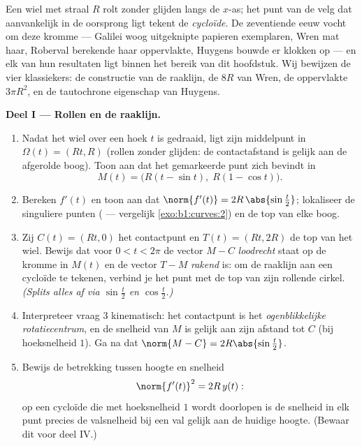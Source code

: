 \begin{problem}\label{pb:b1:curves:1}
Een wiel met straal $R$ rolt zonder glijden langs de $x$-as; het
punt van de velg dat aanvankelijk in de oorsprong ligt tekent de
\emph{cycloïde}. De zeventiende eeuw vocht om deze kromme ---
Galilei woog uitgeknipte papieren exemplaren, Wren mat haar,
Roberval berekende haar oppervlakte, Huygens bouwde er klokken op
--- en elk van hun resultaten ligt binnen het bereik van dit
hoofdstuk. Wij bewijzen de vier klassiekers: de constructie van de
raaklijn, de  $8R$ van Wren, de oppervlakte $3\pi R^2$, en de
tautochrone eigenschap van
Huygens.

\medskip
\noindent\textbf{Deel I --- Rollen en de raaklijn.}
\begin{enumerate}
  \item Nadat het wiel over een hoek $t$ is gedraaid, ligt zijn
        middelpunt in $\Omega(t) = (Rt, R)$ (rollen zonder glijden:
        de contactafstand is gelijk aan de afgerolde boog). Toon
        aan dat het gemarkeerde punt zich bevindt in
        \[
        M(t) = \bigl(R(t - \sin t),\; R(1 - \cos t)\bigr).
        \]
  \item Bereken $f'(t)$ en toon aan dat $\norm{f'(t)} =
        2R\,\abs{\sin\frac t2}$; lokaliseer de singuliere punten
        ( --- vergelijk \cref{exo:b1:curves:2}) en de top
        van elke boog.
  \item Zij $C(t) = (Rt, 0)$ het contactpunt en $T(t) = (Rt, 2R)$
        de top van het wiel. Bewijs dat voor $0 < t < 2\pi$ de
        vector $M - C$ \emph{loodrecht} staat op de kromme in
        $M(t)$ en de vector $T - M$ \emph{rakend} is: om de
        raaklijn aan een cycloïde te tekenen, verbind je het punt
        met de top van zijn rollende cirkel. \emph{(Splits alles af
        via $\sin\frac t2$ en $\cos\frac t2$.)}
  \item Interpreteer vraag 3 kinematisch: het contactpunt is het
        \emph{ogenblikkelijke rotatiecentrum}, en de snelheid van
        $M$ is gelijk aan zijn afstand tot $C$ (bij hoeksnelheid
        $1$). Ga na dat $\norm{M - C} = 2R\abs{\sin\frac t2}$.
  \item Bewijs de betrekking tussen hoogte en snelheid
        \[
        \norm{f'(t)}^2 = 2R\,y(t) :
        \]
        op een cycloïde die met hoeksnelheid $1$ wordt doorlopen is
        de snelheid in elk punt precies de valsnelheid bij een val
        gelijk aan de huidige hoogte. (Bewaar dit voor deel IV.)
\end{enumerate}


\end{problem}
